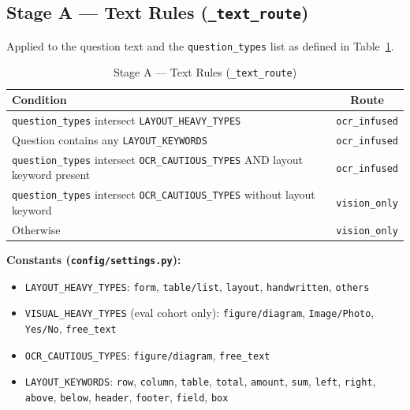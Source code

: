 \documentclass[11pt,a4paper]{article}
\begin{document}
\subsection{Stage A --- Text Rules (\texttt{\_text\_route})}
Applied to the question text and the \texttt{question\_types} list as defined in Table~\ref{tab:text_rules}.

\begin{table}[H]
\centering
\caption{Stage A --- Text Rules (\texttt{\_text\_route})}
\label{tab:text_rules}
\begin{tabular}{|p{10cm}|c|}
\hline
\textbf{Condition} & \textbf{Route} \\ \hline
\texttt{question\_types} intersect \texttt{LAYOUT\_HEAVY\_TYPES} & \texttt{ocr\_infused} \\ \hline
Question contains any \texttt{LAYOUT\_KEYWORDS} & \texttt{ocr\_infused} \\ \hline
\texttt{question\_types} intersect \texttt{OCR\_CAUTIOUS\_TYPES} AND layout keyword present & \texttt{ocr\_infused} \\ \hline
\texttt{question\_types} intersect \texttt{OCR\_CAUTIOUS\_TYPES} without layout keyword & \texttt{vision\_only} \\ \hline
Otherwise & \texttt{vision\_only} \\ \hline
\end{tabular}
\end{table}

\noindent\textbf{Constants (\texttt{config/settings.py}):}
\begin{itemize}
    \item \texttt{LAYOUT\_HEAVY\_TYPES}: \texttt{form}, \texttt{table/list}, \texttt{layout}, \texttt{handwritten}, \texttt{others}
    \item \texttt{VISUAL\_HEAVY\_TYPES} (eval cohort only): \texttt{figure/diagram}, \texttt{Image/Photo}, \texttt{Yes/No}, \texttt{free\_text}
    \item \texttt{OCR\_CAUTIOUS\_TYPES}: \texttt{figure/diagram}, \texttt{free\_text}
    \item \texttt{LAYOUT\_KEYWORDS}: \texttt{row}, \texttt{column}, \texttt{table}, \texttt{total}, \texttt{amount}, \texttt{sum}, \texttt{left}, \texttt{right}, \texttt{above}, \texttt{below}, \texttt{header}, \texttt{footer}, \texttt{field}, \texttt{box}
\end{itemize}
\end{document}
